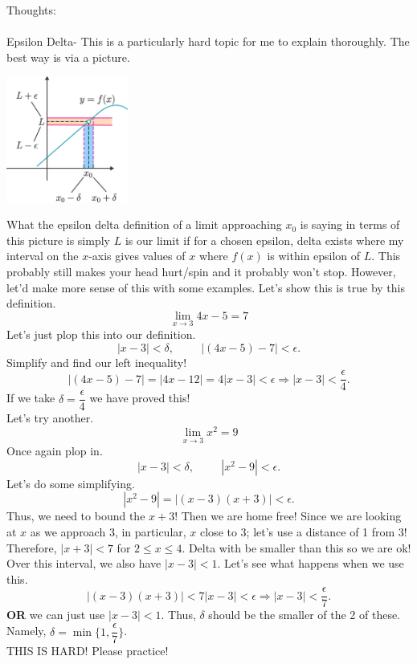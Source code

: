 \documentclass[10pt]{article}
\newcommand{\ds}{\displaystyle}
\theoremstyle{Theorem}
\theoremstyle{definition}
\theoremstyle{remark}
\theoremstyle{custom}
\begin{document}
\thispagestyle{firststyle}
\pagestyle{plain}

Thoughts:\\\\
Epsilon Delta- This is a particularly hard topic for me to explain thoroughly. The best way is via a picture.\\
\begin{center}
\includegraphics[width=4cm]{edlimit.png}
\end{center}
What the epsilon delta definition of a limit approaching $x_0$ is saying in terms of this picture is simply $L$ is our limit if for a chosen epsilon, delta exists where my interval on the $x$-axis gives values of $x$ where $f(x)$ is within epsilon of $L$. This probably still makes your head hurt/spin and it probably won't stop. However, let'd make more sense of this with some examples. Let's show this is true by this definition.
$$\ds\lim_{x\rightarrow 3}4x-5=7$$
Let's just plop this into our definition.
$$|x-3|<\delta, \hspace{1cm} |(4x-5)-7|<\epsilon.$$
Simplify and find our left inequality!
$$|(4x-5)-7|=|4x-12|=4|x-3|<\epsilon \Rightarrow |x-3|<\dfrac{\epsilon}{4}.$$
If we take $\delta=\dfrac{\epsilon}{4}$ we have proved this!\\
Let's try another.
$$\ds\lim_{x\rightarrow 3}x^2=9$$
Once again plop in.
$$|x-3|<\delta, \hspace{1cm} |x^2-9|<\epsilon.$$
Let's do some simplifying.
$$|x^2-9|=|(x-3)(x+3)|<\epsilon.$$
Thus, we need to bound the $x+3$! Then we are home free!
Since we are looking at $x$ as we approach 3, in particular, $x$ close to 3; let's use a distance of 1 from 3! Therefore, $|x+3|<7$ for $2\leq x\leq 4$. Delta with be smaller than this so we are ok! Over this interval, we also have $|x-3|<1$. Let's see what happens when we use this.
$$|(x-3)(x+3)|<7|x-3|<\epsilon\Rightarrow |x-3|<\dfrac{\epsilon}{7}.$$
\textbf{OR} we can just use $|x-3|<1$. Thus, $\delta$ should be the smaller of the 2 of these. Namely, $\delta=\min\lbrace 1, \dfrac{\epsilon}{7}\rbrace$.\\
THIS IS HARD! Please practice!\\\\
\end{document}
